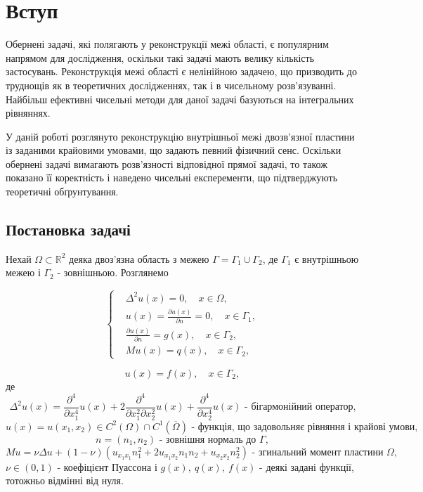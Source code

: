 \documentclass[12pt]{report}
\begin{document}
\tableofcontents


\chapter*{Вступ}
 
 \quad Обернені задачі, які полягають у реконструкції межі області, є популярним напрямом для дослідження, оскільки такі задачі мають велику кількість застосувань. Реконструкція межі області є нелінійною задачею, що призводить до труднощів як в теоретичних дослідженнях, так і в чисельному розв'язуванні. Найбільш ефективні чисельні методи для даної задачі базуються на інтегральних рівняннях. 
 
 У даній роботі розглянуто реконструкцію внутрішньої межі двозв'язної пластини із заданими крайовими умовами, що задають певний фізичний сенс. Оскільки обернені задачі вимагають розв'язності відповідної прямої задачі, то також показано її коректність і наведено чисельні експеременти, що підтверджують теоретичні обґрунтування.

 \section*{Постановка задачі}
Нехай $\Omega\subset \mathbb{R}^2$ деяка двоз'язна область з межею $\Gamma=\Gamma_1\cup\Gamma_2$, де $\Gamma_1$ є внутрішньою межею і $\Gamma_2$ - зовнішньою. Розглянемо

\begin{equation}
	\left\{
	\label{directProblem}
	\begin{split}
		&\Delta^2 u(x)=0, \quad x\in\Omega, \\
		&u(x)=\frac{\partial u(x)}{\partial n}=0, \quad x\in\Gamma_1, \\
		&\frac{\partial u(x)}{\partial n}=g(x), \quad x\in\Gamma_2, \\
		&Mu(x)=q(x), \quad x\in\Gamma_2,
	\end{split}
	\right.
\end{equation}

\begin{equation}
	\label{dataEq}
	u(x)=f(x), \quad x\in\Gamma_2,
\end{equation}
де 
$$\Delta^{2}u(x)=\frac{\partial^{4}}{\partial x_1^4}u(x)+2\frac{\partial^{4}}{\partial x_1^2\partial x_2^2}u(x)+\frac{\partial^{4}}{\partial x_2^4}u(x) \textrm{ - бігармонійний оператор,}
$$
 $$u(x)=u(x_1,x_2) \in C^2(\Omega)\cap C^1(\overline{\Omega}) \textrm{ - функція, що задовольняє рівняння і крайові умови}, $$
 $$n=(n_1, n_2) \textrm{ - зовнішня нормаль до }\Gamma,$$ 
 $$Mu=\nu\Delta u+(1-\nu)(u_{x_1 x_1}n_1^2+2u_{x_1 x_2}n_1 n_2+u_{x_2 x_2}n_2^2) \textrm{ - згинальний момент пластини } \Omega,
 $$ 
 $\nu\in (0, 1)$ - коефіцієнт Пуассона і $g(x), \ q(x),\  f(x)$ - деякі задані функції, тотожньо відмінні від нуля.
 
\end{document}
